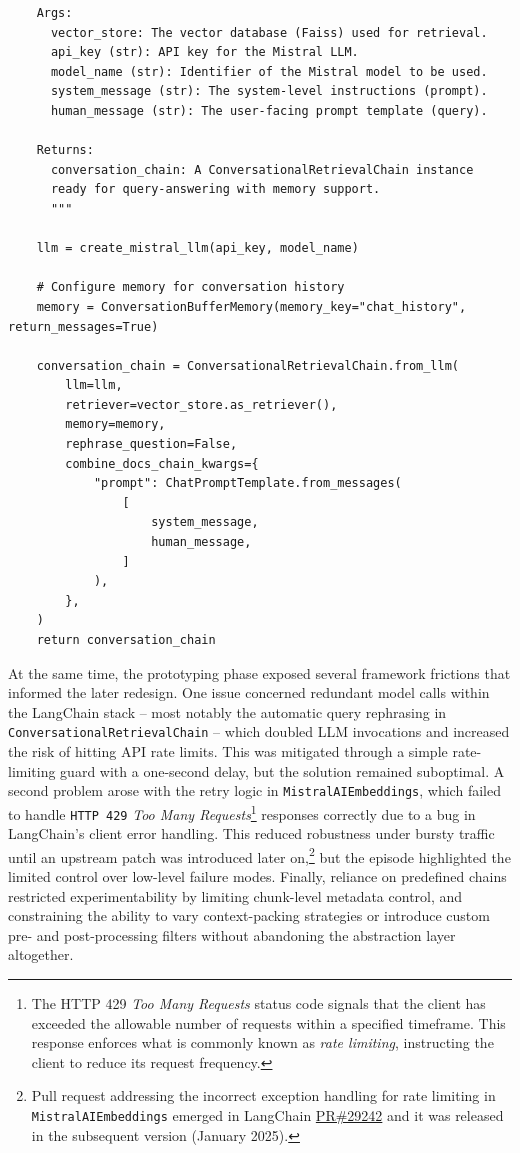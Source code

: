 \begin{spacing}{1.5}
\begin{lstlisting}
    Args:
      vector_store: The vector database (Faiss) used for retrieval.
      api_key (str): API key for the Mistral LLM.
      model_name (str): Identifier of the Mistral model to be used.
      system_message (str): The system-level instructions (prompt).
      human_message (str): The user-facing prompt template (query).

    Returns:
      conversation_chain: A ConversationalRetrievalChain instance 
      ready for query-answering with memory support.
      """

    llm = create_mistral_llm(api_key, model_name)
    
    # Configure memory for conversation history
    memory = ConversationBufferMemory(memory_key="chat_history", return_messages=True)

    conversation_chain = ConversationalRetrievalChain.from_llm(
        llm=llm,
        retriever=vector_store.as_retriever(),
        memory=memory,
        rephrase_question=False,
        combine_docs_chain_kwargs={
            "prompt": ChatPromptTemplate.from_messages(
                [
                    system_message,
                    human_message,
                ]
            ),
        },
    )
    return conversation_chain
\end{lstlisting}

At the same time, the prototyping phase exposed several framework frictions that informed the later redesign. One issue concerned redundant model calls within the LangChain stack -- most notably the automatic query rephrasing in \texttt{ConversationalRetrievalChain} -- which doubled LLM invocations and increased the risk of hitting API rate limits. This was mitigated through a simple rate-limiting guard with a one-second delay, but the solution remained suboptimal. A second problem arose with the retry logic in \texttt{MistralAIEmbeddings}, which failed to handle \texttt{HTTP 429} \textit{Too Many Requests}\footnote{The HTTP 429 \textit{Too Many Requests} status code signals that the client has exceeded the allowable number of requests within a specified timeframe. This response enforces what is commonly known as \textit{rate limiting}, instructing the client to reduce its request frequency.} responses correctly due to a bug in LangChain’s client error handling. This reduced robustness under bursty traffic until an upstream patch was introduced later on,\footnote{Pull request addressing the incorrect exception handling for rate limiting in \texttt{MistralAIEmbeddings} emerged in LangChain \href{https://web.archive.org/web/20250823161804/https://github.com/langchain-ai/langchain/pull/29242}{PR\#29242} and it was released in the subsequent version (January 2025).}\nocite{noauthor_mistralai_2025} but the episode highlighted the limited control over low-level failure modes. Finally, reliance on predefined chains restricted experimentability by limiting chunk-level metadata control, and constraining the ability to vary context-packing strategies or introduce custom pre- and post-processing filters without abandoning the abstraction layer altogether.


\end{spacing}
